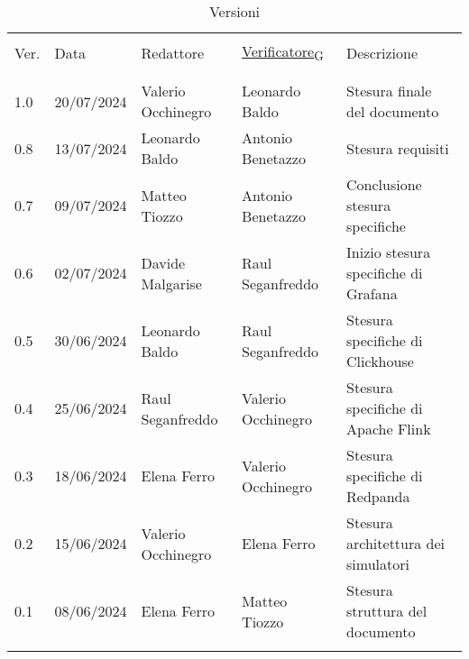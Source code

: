 \documentclass[italian,12pt]{article} %
\begin{document}


\newpage



\captionsetup[table]{list=no}
\begin{table}[!h]
	\footnotesize
	\begin{center}
		\caption*{Versioni}
		\vspace{0.5cm}
		\begin{tabular}{ l l l l p{6.1cm} }
			\hline                                                                                                          \\[-2ex]
			Ver. & Data & Redattore & \href{https://7last.github.io/docs/pb/documentazione-interna/glossario\#verificatore}{Verificatore\textsubscript{G}} & Descrizione\\
			\\[-2ex] \hline \\[-1.5ex]
      1.0  & 20/07/2024 & Valerio Occhinegro & Leonardo Baldo     & Stesura finale del documento \\
      0.8  & 13/07/2024 & Leonardo Baldo     & Antonio Benetazzo  & Stesura requisiti \\
      0.7  & 09/07/2024 & Matteo Tiozzo      & Antonio Benetazzo  & Conclusione stesura specifiche \\
      0.6  & 02/07/2024 & Davide Malgarise   & Raul Seganfreddo   & Inizio stesura specifiche di Grafana \\
      0.5  & 30/06/2024 & Leonardo Baldo     & Raul Seganfreddo   & Stesura specifiche di Clickhouse \\
      0.4  & 25/06/2024 & Raul Seganfreddo   & Valerio Occhinegro & Stesura specifiche di Apache Flink\\
      0.3  & 18/06/2024 & Elena Ferro        & Valerio Occhinegro & Stesura specifiche di Redpanda\\
      0.2  & 15/06/2024 & Valerio Occhinegro & Elena Ferro        & Stesura architettura dei simulatori  \\
      0.1  & 08/06/2024 & Elena Ferro        & Matteo Tiozzo      & Stesura struttura del documento \\
			\\[-1.5ex] \hline
		\end{tabular}
	\end{center}
\end{table}
\captionsetup[table]{list=yes}

\newpage

\tableofcontents

\newpage

\listoftables

\listoffigures

\lstlistoflistings

\newpage




\newpage



\newpage



\newpage

% 



\end{document}
